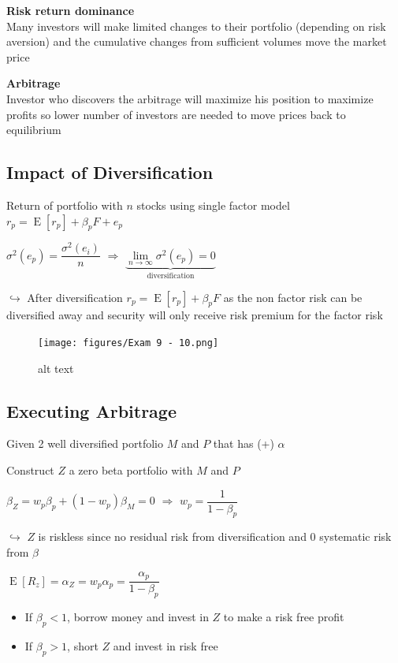 \documentclass[]{book}
\theoremstyle{definition}
\theoremstyle{definition}
\theoremstyle{remark}
\begin{document}
\textbf{Risk return dominance}\\
Many investors will make limited changes to their portfolio (depending
on risk aversion) and the cumulative changes from sufficient volumes
move the market price

\textbf{Arbitrage}\\
Investor who discovers the arbitrage will maximize his position to
maximize profits so lower number of investors are needed to move prices
back to equilibrium

\subsection{Impact of Diversification}\label{impact-of-diversification}

Return of portfolio with \(n\) stocks using single factor model
\(r_p = \operatorname{E}[r_p] + \beta_p F + e_p\)

\(\sigma^2(e_p) = \dfrac{\sigma^2(e_i)}{n}\) \(\Rightarrow\)
\(\underbrace{\lim \limits_{n \rightarrow \infty} \sigma^2(e_p) = 0}_{\text{diversification}}\)

\(\hookrightarrow\) After diversification
\(r_p = \operatorname{E}[r_p] + \beta_p F\) as the non factor risk can
be diversified away and security will only receive risk premium for the
factor risk

\begin{figure}[htbp]
\centering
\texttt{[image: figures/Exam 9 - 10.png]}
\caption{alt text}
\end{figure}

\subsection{Executing Arbitrage}\label{executing-arbitrage}

Given 2 well diversified portfolio \(M\) and \(P\) that has (+)
\(\alpha\)

Construct \(Z\) a zero beta portfolio with \(M\) and \(P\)

\(\beta_Z = w_p \beta_p + (1-w_p)\beta_M = 0\) \(\Rightarrow\)
\(w_p = \dfrac{1}{1-\beta_p}\)

\(\hookrightarrow\) \(Z\) is riskless since no residual risk from
diversification and 0 systematic risk from \(\beta\)

\(\operatorname{E}[R_z] = \alpha_Z = w_p \alpha_p = \dfrac{\alpha_p}{1 - \beta_p}\)

\begin{itemize}
\item
  If \(\beta_p < 1\), borrow money and invest in \(Z\) to make a risk
  free profit
\item
  If \(\beta_p > 1\), short \(Z\) and invest in risk free
\end{itemize}
\end{document}
